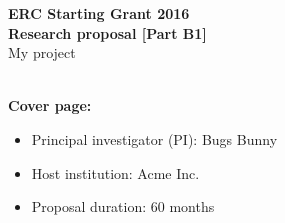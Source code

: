 %
%

\begin{center}
  \vbox{\vspace{1.5cm}}
  \Large{\textbf{%
      ERC Starting Grant 2016\\
      Research proposal [Part B1]\\}
  }
  \vspace{1cm}
  \huge{My project}\\
  \vspace{1cm}
  \huge{\project}\\
  \vspace{1cm}
\end{center}

\textbf{Cover page:}
\begin{itemize}
\item Principal investigator (PI): Bugs Bunny
\item Host institution: Acme Inc.
\item Proposal duration: 60 months
\end{itemize}
\fbox{\parbox{17cm}{}}
\vfill
\newpage

